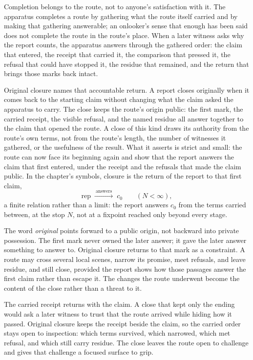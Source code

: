 Completion belongs to the route, not to anyone's satisfaction with it. The
apparatus completes a route by gathering what the route itself carried and by
making that gathering answerable; an onlooker's sense that enough has been said
does not complete the route in the route's place. When a later witness asks why
the report counts, the apparatus answers through the gathered order: the claim
that entered, the receipt that carried it, the comparison that pressed it, the
refusal that could have stopped it, the residue that remained, and the return
that brings those marks back intact.

Original closure names that accountable return. A report closes originally when
it comes back to the starting claim without changing what the claim asked the
apparatus to carry. The close keeps the route's origin public: the first mark,
the carried receipt, the visible refusal, and the named residue all answer
together to the claim that opened the route. A close of this kind draws its
authority from the route's own terms, not from the route's length, the number of
witnesses it gathered, or the usefulness of the result. What it asserts is
strict and small: the route can now face its beginning again and show that the
report answers the claim that first entered, under the receipt and the refusals
that made the claim public. In the chapter's symbols, closure is the return of the report to that first claim,
\[ \mathrm{rep} \;\xrightarrow{\ \text{answers}\ }\; c_0 \qquad (N < \infty), \]
a finite relation rather than a limit: the report answers $c_0$ from the terms carried between, at the stop $N$, not at a fixpoint reached only beyond every stage.

The word \emph{original} points forward to a public origin, not backward into
private possession. The first mark never owned the later answer; it gave the
later answer something to answer to. Original closure returns to that mark as a
constraint. A route may cross several local scenes, narrow its promise, meet
refusals, and leave residue, and still close, provided the report shows how
those passages answer the first claim rather than escape it. The changes the
route underwent become the content of the close rather than a threat to it.

The carried receipt returns with the claim. A close that kept only the ending
would ask a later witness to trust that the route arrived while hiding how it
passed. Original closure keeps the receipt beside the claim, so the carried
order stays open to inspection: which terms survived, which narrowed, which met
refusal, and which still carry residue. The close leaves the route open to
challenge and gives that challenge a focused surface to grip.

